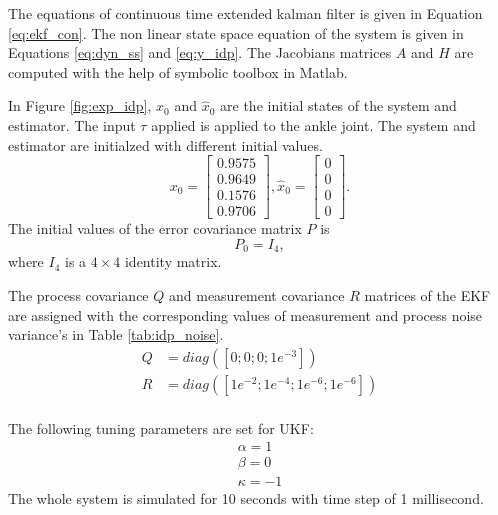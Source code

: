  The equations of continuous time extended kalman filter is given in Equation \ref{eq:ekf_con}. The non linear state space equation of the system is given in Equations \ref{eq:dyn_ss} and \ref{eq:y_idp}. The Jacobians matrices $A$ and $H$ are computed with the help of symbolic toolbox in Matlab.

In Figure \ref{fig:exp_idp}, $x_0$ and $\hat x_0$ are the initial states of the system and estimator. The input $\tau$ applied is applied to the ankle joint. The system and estimator are initialzed with different initial values. 
$$ x_0 = \begin{bmatrix} 0.9575 \\ 0.9649\\ 0.1576\\ 0.9706 \end{bmatrix}, \hat x_0 = \begin{bmatrix} 0 \\ 0\\ 0\\ 0 \end{bmatrix}.$$  
The initial values of the error covariance matrix $P$ is $$P_0 = I_4, $$ where $I_4$ is a $4 \times 4$ identity matrix.


The process covariance $Q$ and measurement covariance $R$ matrices of the EKF are assigned with the corresponding values of measurement and process noise variance's in Table \ref{tab:idp_noise}.
$$  \begin{aligned}
    Q&=diag([0; 0; 0; 1e^{-3}]) \\
    R&=diag([1e^{-2}; 1e^{-4}; 1e^{-6}; 1e^{-6}]) \\
    \end{aligned}
    $$

The following tuning parameters are set for UKF:
$$  \begin{aligned}
    \alpha = 1 \\
    \beta = 0\\
    \kappa = -1 
    \end{aligned} $$ 
The whole system is simulated for 10 seconds with time step of 1 millisecond.
